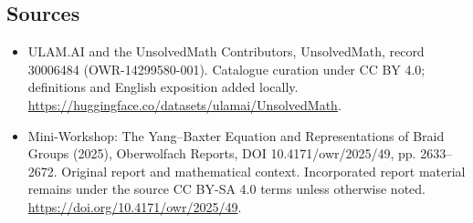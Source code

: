 \documentclass[11pt]{article}
\begin{document}
\subsection{Sources}
\begin{itemize}
\item[\hypertarget{source:30006484:1}{S1}] ULAM.AI and the UnsolvedMath Contributors, UnsolvedMath, record 30006484 (OWR-14299580-001). Catalogue curation under CC BY 4.0; definitions and English exposition added locally.
\url{https://huggingface.co/datasets/ulamai/UnsolvedMath}.
\item[\hypertarget{source:30006484:2}{S2}] Mini-Workshop: The Yang–Baxter Equation and Representations of Braid Groups (2025), Oberwolfach Reports, DOI 10.4171/owr/2025/49, pp. 2633--2672. Original report and mathematical context. Incorporated report material remains under the source CC BY-SA 4.0 terms unless otherwise noted.
\url{https://doi.org/10.4171/owr/2025/49}.
\end{itemize}
\label{end:30006484}
\end{document}
